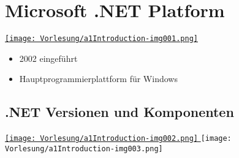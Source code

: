 \section{Microsoft .NET Platform}

\begin{center}
\href{https://worldcompressed.blogspot.com/2016/06/download-microsoft-net-framework-all.html}{ \texttt{[image: Vorlesung/a1Introduction-img001.png]} }
\end{center}


\begin{itemize}
\item 2002 eingeführt
\item Hauptprogrammierplattform für Windows
\end{itemize}

\subsection{.NET Versionen und Komponenten}
\begin{center}
\href{https://de.wikipedia.org/wiki/.NET_Framework}{ \texttt{[image: Vorlesung/a1Introduction-img002.png]} }
\texttt{[image: Vorlesung/a1Introduction-img003.png]} 
\end{center}

